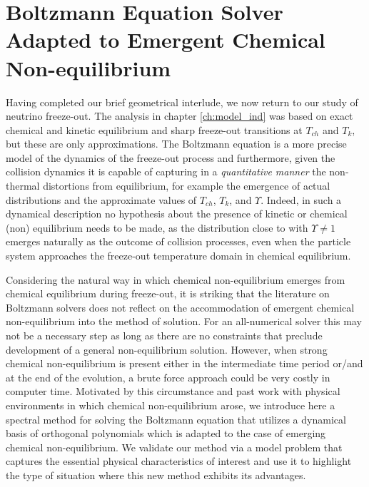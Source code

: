 \chapter{Boltzmann Equation Solver Adapted to Emergent Chemical Non-equilibrium}\label{ch:boltz_orthopoly}

Having completed our brief geometrical interlude, we now return to our study of neutrino freeze-out. The analysis in chapter \ref{ch:model_ind} was based on exact chemical and kinetic equilibrium and sharp freeze-out transitions at $T_{ch}$ and $T_k$, but these are  only approximations.  The  Boltzmann equation is a more precise model of the dynamics of the freeze-out process and furthermore, given the collision dynamics it is capable of capturing in a {\em quantitative manner} the non-thermal distortions from equilibrium, for example the emergence of actual distributions and the approximate values  of $T_{ch}$, $T_k$, and $\Upsilon$.  Indeed,  in  such a dynamical description no hypothesis about the presence of kinetic or chemical (non) equilibrium needs to be made, as the distribution close to  with   $\Upsilon\ne  1$ emerges naturally as the outcome of collision processes, even when the particle system approaches the freeze-out temperature domain  in chemical equilibrium.

Considering the natural way in which chemical non-equilibrium emerges from chemical equilibrium during freeze-out, it is striking that the literature on Boltzmann solvers does not reflect on the accommodation of emergent chemical non-equilibrium into the method of solution. For an all-numerical solver this may not be a necessary step as long as there are no constraints that preclude development of a general non-equilibrium solution. However, when strong chemical non-equilibrium is present either in the intermediate time period or/and at the end of the evolution, a brute force approach could be very costly in computer time. Motivated by this circumstance and past work with physical environments in which chemical non-equilibrium arose,  we introduce here a  spectral method for solving the Boltzmann equation that utilizes a dynamical basis of orthogonal polynomials which is adapted to the case of emerging chemical non-equilibrium. We validate our method via a  model problem  that captures the essential physical characteristics of interest and use it to highlight the type of situation where this new method exhibits its advantages.

